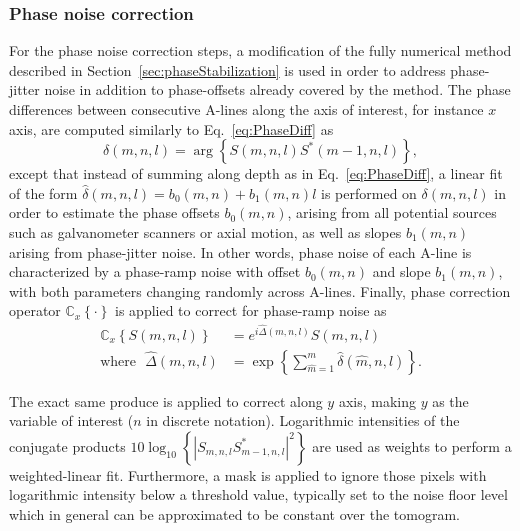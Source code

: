 \subsubsection{Phase noise correction}

For the phase noise correction steps, a modification of the fully numerical method described in Section~\ref{sec:phaseStabilization} is used in order to address phase-jitter noise in addition to phase-offsets already covered by the method. The phase differences between consecutive A-lines along the axis of interest, for instance $x$ axis, are computed similarly to Eq.~\eqref{eq:PhaseDiff} as
\begin{equation}
    \delta(m,n,l) = \arg\left\{S(m,n,l)S^*(m-1,n,l)\right\},
\end{equation}
except that instead of summing along depth as in Eq.~\eqref{eq:PhaseDiff}, a linear fit of the form $\hat{\delta}(m,n,l) = b_0(m,n) + b_1(m,n)l$ is performed on $\delta(m,n,l)$ in order to estimate the phase offsets $b_0(m,n)$, arising from all potential sources such as galvanometer scanners or axial motion, as well as slopes $b_1(m,n)$ arising from phase-jitter noise. In other words, phase noise of each A-line is characterized by a phase-ramp noise with offset $b_0(m,n)$ and slope $b_1(m,n)$, with both parameters changing randomly across A-lines. Finally, phase correction operator $\mathbb{C}_x\left\{\cdot\right\}$ is applied to correct for phase-ramp noise as
\begin{align}\label{eq:phaseDiffJitterCor}
   \mathbb{C}_x\left\{S(m,n,l)\right\} &= e^{i\hat{\Delta}(m,n,l)} S(m,n,l) \nonumber\\ \text{where} \ \ \ \hat{\Delta}(m,n,l) &= \exp\left\{\sum_{\hat{m} = 1}^m \hat{\delta}(\hat{m},n,l)\right\}.
\end{align}

The exact same produce is applied to correct along $y$ axis, making $y$ as the variable of interest ($n$ in discrete notation). Logarithmic intensities of the conjugate products $10\log_{10}\left\{|S_{m,n,l}S^*_{m-1,n,l}|^2\right\}$ are used as weights to perform a weighted-linear fit. Furthermore, a mask is applied to ignore those pixels with logarithmic intensity below a threshold value, typically set to the noise floor level which in general can be approximated to be constant over the tomogram.


